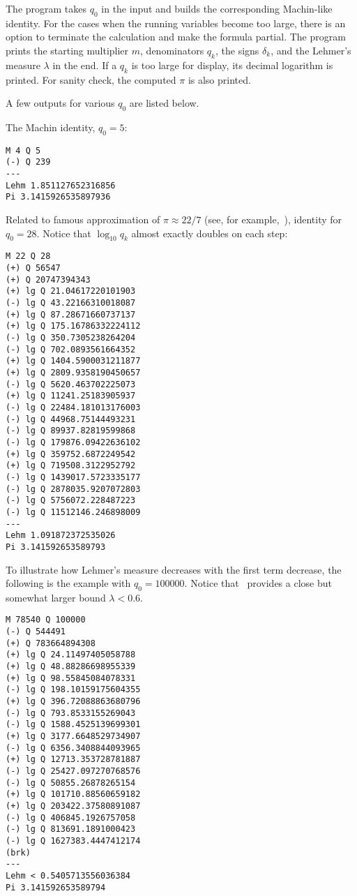 \documentclass[draft, 10pt]{article} %
\begin{document}
The program takes $q_0$ in the input and builds the corresponding Machin-like identity.
For the cases when the running variables become too large, there is an option
to terminate the calculation and make the formula partial. The program prints the starting
multiplier $m$, denominators $q_k$, the signs $\delta_k$, and the Lehmer's
measure $\lambda$ in the end. If a $q_k$ is too large for display, its decimal logarithm
is printed. For sanity check, the computed $\pi$ is also printed.

A few outputs for various $q_0$ are listed below.

The Machin identity, $q_0 = 5$:
\begin{verbatim}
M 4 Q 5
(-) Q 239
---
Lehm 1.851127652316856
Pi 3.1415926535897936
\end{verbatim}

Related to famous approximation of $\pi \approx 22/7$ (see, for example,~\cite{source-pi}),
identity for $q_0 = 28$. Notice that $\log_{10} q_k$ almost exactly doubles on each step:
\begin{verbatim}
M 22 Q 28
(+) Q 56547
(+) Q 20747394343
(+) lg Q 21.04617220101903
(-) lg Q 43.22166310018087
(+) lg Q 87.28671660737137
(+) lg Q 175.16786332224112
(-) lg Q 350.7305238264204
(-) lg Q 702.0893561664352
(+) lg Q 1404.5900031211877
(+) lg Q 2809.9358190450657
(-) lg Q 5620.463702225073
(+) lg Q 11241.25183905937
(-) lg Q 22484.181013176003
(-) lg Q 44968.75144493231
(-) lg Q 89937.82819599868
(-) lg Q 179876.09422636102
(+) lg Q 359752.6872249542
(+) lg Q 719508.3122952792
(-) lg Q 1439017.5723335177
(-) lg Q 2878035.9207072803
(-) lg Q 5756072.228487223
(-) lg Q 11512146.246898009
---
Lehm 1.091872372535026
Pi 3.141592653589793
\end{verbatim}

\pagebreak
To illustrate how Lehmer's measure decreases with the first term decrease, the following is
the example with $q_0 = 100000$. Notice that~ provides a close but
somewhat larger bound $\lambda < 0.6$.

\begin{verbatim}
M 78540 Q 100000
(-) Q 544491
(+) Q 783664894308
(+) lg Q 24.11497405058788
(+) lg Q 48.88286698955339
(+) lg Q 98.55845084078331
(-) lg Q 198.10159175604355
(+) lg Q 396.72088863680796
(-) lg Q 793.8533155269043
(-) lg Q 1588.4525139699301
(+) lg Q 3177.6648529734907
(-) lg Q 6356.3408844093965
(+) lg Q 12713.353728781887
(-) lg Q 25427.097270768576
(-) lg Q 50855.26878265154
(+) lg Q 101710.88560659182
(+) lg Q 203422.37580891087
(-) lg Q 406845.1926757058
(-) lg Q 813691.1891000423
(-) lg Q 1627383.4447412174
(brk)
---
Lehm < 0.5405713556036384
Pi 3.141592653589794
\end{verbatim}
\end{document}
